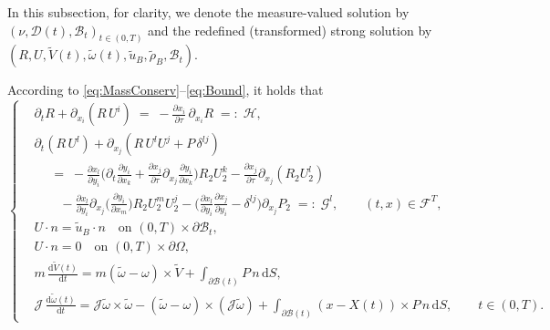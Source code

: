 \documentclass[11pt,twoside,reqno]{amsart}
\numberwithin{equation}{section}
\numberwithin{figure}{section}
\begin{document}
In this subsection, for clarity, we denote the measure-valued solution by \((\nu,\mathcal{D}(t),\mathcal{B}_t)_{t\in(0,T)}\) and the redefined (transformed) strong solution by \((R,U,\tilde V(t),\tilde\omega(t),\tilde u_B,\tilde\rho_B, \mathcal{B}_t)\).

According to \eqref{eq:MassConserv}--\eqref{eq:Bound}, it holds that
\begin{equation}\label{eq:transormedStrongSolution}
\left\{
\begin{aligned}
&\partial_t R + \partial_{x_i}(R\,U^i)
     \;=\; -\frac{\partial x_i}{\partial \tau}\,\partial_{x_i}R \;=:\; \mathcal{H},\\
&\partial_t(R\,U^l) + \partial_{x_j}(R\,U^lU^j + P\,\delta^{lj}) \\
&\quad \;=\; -\frac{\partial x_l}{\partial y_i}\!\Big(
\partial_t\frac{\partial y_i}{\partial x_k}
+\frac{\partial x_j}{\partial\tau}\partial_{x_j}\frac{\partial y_i}{\partial x_k}\Big)
R_2U_2^k
-\frac{\partial x_j}{\partial\tau}\partial_{x_j}(R_2U_2^l)\\&\qquad-\frac{\partial x_l}{\partial y_i}\partial_{x_j}\Big(\frac{\partial y_i}{\partial x_m}\Big)R_2U_2^mU_2^j-\Big(\frac{\partial x_l}{\partial y_i}\frac{\partial x_j}{\partial y_i}-\delta^{lj}\Big)\partial_{x_j}P_2
      \;=:\; \mathcal{G}^l,
      \qquad (t,x)\in \mathcal{F}^T,\\
&U\cdot n=\tilde u_B\cdot n\quad \text{on } (0,T)\times\partial\mathcal{B}_t,\\
&U\cdot n=0\quad \text{on } (0,T)\times\partial\Omega,\\
&m\,\frac{\mathrm{d}\tilde V(t)}{\mathrm{d}t}
   = m(\tilde\omega-\omega)\times \tilde V
     + \int_{\partial\mathcal{B}(t)} P\,n\,\mathrm{d}S,\\
&\mathcal{J}\,\frac{\mathrm{d}\tilde\omega(t)}{\mathrm{d}t}
   = \mathcal{J}\tilde\omega\times\tilde\omega
     -(\tilde\omega-\omega)\times (\mathcal{J}\tilde\omega)
     + \int_{\partial\mathcal{B}(t)} (x-X(t))\times P\,n\,\mathrm{d}S,
\qquad t\in(0,T).
\end{aligned}
\right.
\end{equation}
\end{document}
